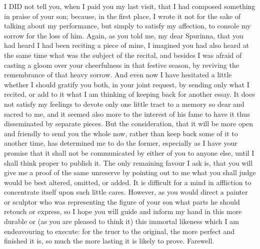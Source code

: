 I DID not tell you, when I paid you my last visit, that I had composed
something in praise of your son; because, in the first place, I wrote it
not for the sake of talking about my performance, but simply to satisfy my
affection, to console my sorrow for the loss of him. Again, as you told
me, my dear Spurinna, that you had heard I had been reciting a piece of
mine, I imagined you had also heard at the same time what was the subject
of the recital, and besides I was afraid of casting a gloom over your
cheerfulness in that festive season, by reviving the remembrance of that
heavy sorrow. And even now I have hesitated a little whether I should
gratify you both, in your joint request, by sending only what I recited,
or add to it what I am thinking of keeping back for another essay. It does
not satisfy my feelings to devote only one little tract to a memory so
dear and sacred to me, and it seemed also more to the interest of his fame
to have it thus disseminated by separate pieces. But the consideration,
that it will be more open and friendly to send you the whole now, rather
than keep back some of it to another time, has determined me to do the
former, especially as I have your promise that it shall not be
communicated by either of you to anyone else, until I shall think proper
to publish it. The only remaining favour I ask is, that you will give me a
proof of the same unreserve by pointing out to me what you shall judge
would be best altered, omitted, or added. It is difficult for a mind in
affliction to concentrate itself upon such little cares. However, as you
would direct a painter or sculptor who was representing the figure of your
son what parts he should retouch or express, so I hope you will guide and
inform my hand in this more durable or (as you are pleased to think it)
this immortal likeness which I am endeavouring to execute: for the truer
to the original, the more perfect and finished it is, so much the more
lasting it is likely to prove. Farewell.


